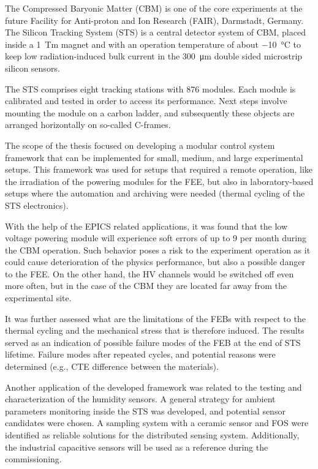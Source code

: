The Compressed Baryonic Matter (CBM) is one of the core experiments at the future Facility for Anti-proton and Ion Research (FAIR), Darmstadt, Germany. The Silicon Tracking System (STS) is a central detector system of CBM, placed inside a 1~Tm magnet and with an operation temperature of about \SI{-10}{\celsius} to keep low radiation-induced bulk current in the \SI{300}{\micro\metre} double sided microstrip silicon sensors.

The STS comprises eight tracking stations with 876 modules. Each module is calibrated and tested in order to access its performance. Next steps involve mounting the module on a carbon ladder, and subsequently these objects are arranged horizontally on so-called C-frames.

The scope of the thesis focused on developing a modular control system framework that can be implemented for small, medium, and large experimental setups. This framework was used for setups that required a remote operation, like the irradiation of the powering modules for the \gls{FEE}, but also in laboratory-based setups where the automation and archiving were needed (thermal cycling of the \gls{STS} electronics).

With the help of the \gls{EPICS} related applications, it was found that the low voltage powering module will experience soft errors of up to 9 per month during the \gls{CBM} operation. Such behavior poses a risk to the experiment operation as it could cause deterioration of the physics performance, but also a possible danger to the \gls{FEE}. On the other hand, the \gls{HV} channels would be switched off even more often, but in the case of the \gls{CBM} they are located far away from the experimental site.

It was further assessed what are the limitations of the \glspl{FEB} with respect to the thermal cycling and the mechanical stress that is therefore induced. The results served as an indication of possible failure modes of the \gls{FEB} at the end of \gls{STS} lifetime. Failure modes after repeated cycles, and potential reasons were determined (e.g., \gls{CTE} difference between the materials). 

Another application of the developed framework was related to the testing and characterization of the humidity sensors. A general strategy for ambient parameters monitoring inside the \gls{STS} was developed, and potential sensor candidates were chosen. A sampling system with a ceramic sensor and \gls{FOS} were identified as reliable solutions for the distributed sensing system. Additionally, the industrial capacitive sensors will be used as a reference during the commissioning.

